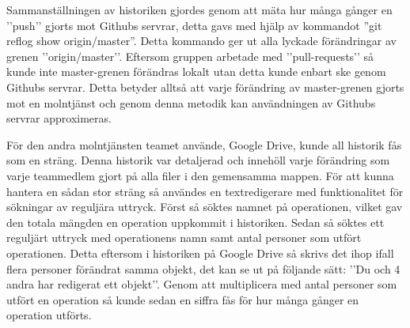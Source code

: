 Sammanställningen av historiken gjordes genom att mäta hur många gånger en ’’push’’ gjorts mot Githubs servrar, detta gavs med hjälp av kommandot ”git reflog show origin/master”. Detta kommando ger ut alla lyckade förändringar av grenen ’’origin/master’’. Eftersom gruppen arbetade med ’’pull-requests’’ så kunde inte master-grenen förändras lokalt utan detta kunde enbart ske genom Githubs servrar. Detta betyder alltså att varje förändring av master-grenen gjorts mot en molntjänst och genom denna metodik kan användningen av Githubs servrar approximeras. 

För den andra molntjänsten teamet använde, Google Drive, kunde all historik fås som en sträng. Denna historik var detaljerad och innehöll varje förändring som varje teammedlem gjort på alla filer i den gemensamma mappen. För att kunna hantera en sådan stor sträng så användes en textredigerare med funktionalitet för sökningar av reguljära uttryck. Först så söktes namnet på operationen, vilket gav den totala mängden en operation uppkommit i historiken. Sedan så söktes ett reguljärt uttryck med operationens namn samt antal personer som utfört operationen. Detta eftersom i historiken på Google Drive så skrivs det ihop ifall flera personer förändrat samma objekt, det kan se ut på följande sätt: ’’Du och 4 andra har redigerat ett objekt’’. Genom att multiplicera med antal personer som utfört en operation så kunde sedan en siffra fås för hur många gånger en operation utförts.

